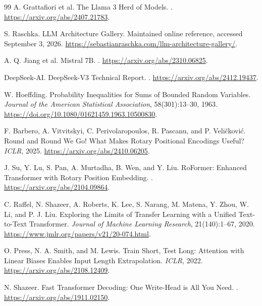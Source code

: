 \documentclass[11pt,twoside]{article}
\theoremstyle{plain}
\theoremstyle{definition}
\theoremstyle{remark}
\begin{document}
\begin{thebibliography}{99}
A. Grattafiori et al.
\newblock The Llama 3 Herd of Models.
.
\newblock \url{https://arxiv.org/abs/2407.21783}.

S. Raschka.
\newblock LLM Architecture Gallery.
\newblock Maintained online reference, accessed September 3, 2026.
\newblock \url{https://sebastianraschka.com/llm-architecture-gallery/}.

A. Q. Jiang et al.
\newblock Mistral 7B.
.
\newblock \url{https://arxiv.org/abs/2310.06825}.

DeepSeek-AI.
\newblock DeepSeek-V3 Technical Report.
.
\newblock \url{https://arxiv.org/abs/2412.19437}.

W. Hoeffding.
\newblock Probability Inequalities for Sums of Bounded Random Variables.
\newblock \emph{Journal of the American Statistical Association},
58(301):13--30, 1963.
\newblock \url{https://doi.org/10.1080/01621459.1963.10500830}.

F. Barbero, A. Vitvitskyi, C. Perivolaropoulos, R. Pascanu,
and P. Veli\v{c}kovi\'c.
\newblock Round and Round We Go! What Makes Rotary Positional Encodings Useful?
\newblock \emph{ICLR}, 2025.
\newblock \url{https://arxiv.org/abs/2410.06205}.

J. Su, Y. Lu, S. Pan, A. Murtadha, B. Wen, and Y. Liu.
\newblock RoFormer: Enhanced Transformer with Rotary Position Embedding.
.
\newblock \url{https://arxiv.org/abs/2104.09864}.

C. Raffel, N. Shazeer, A. Roberts, K. Lee, S. Narang, M. Matena,
Y. Zhou, W. Li, and P. J. Liu.
\newblock Exploring the Limits of Transfer Learning with a Unified
Text-to-Text Transformer.
\newblock \emph{Journal of Machine Learning Research}, 21(140):1--67, 2020.
\newblock \url{https://www.jmlr.org/papers/v21/20-074.html}.

O. Press, N. A. Smith, and M. Lewis.
\newblock Train Short, Test Long: Attention with Linear Biases Enables Input
Length Extrapolation.
\newblock \emph{ICLR}, 2022.
\newblock \url{https://arxiv.org/abs/2108.12409}.

N. Shazeer.
\newblock Fast Transformer Decoding: One Write-Head is All You Need.
.
\newblock \url{https://arxiv.org/abs/1911.02150}.


\end{thebibliography}
\end{document}
